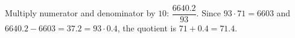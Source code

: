 Multiply numerator and denominator by $10$: $\dfrac{6640.2}{93}$. Since $93\cdot71=6603$ and $6640.2-6603=37.2=93\cdot0.4$, the quotient is $71+0.4=\boxed{71.4}$.
